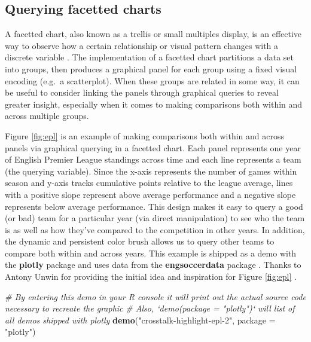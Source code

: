 \documentclass[
  12pt,
]{krantz}
\newenvironment{Shaded}{\begin{snugshade}}{\end{snugshade}}
\newcommand{\CommentTok}[1]{\textcolor[rgb]{0.56,0.35,0.01}{\textit{#1}}}
\newcommand{\DataTypeTok}[1]{\textcolor[rgb]{0.13,0.29,0.53}{#1}}
\newcommand{\KeywordTok}[1]{\textcolor[rgb]{0.13,0.29,0.53}{\textbf{#1}}}
\newcommand{\NormalTok}[1]{#1}
\newcommand{\StringTok}[1]{\textcolor[rgb]{0.31,0.60,0.02}{#1}}
\begin{document}
\hypertarget{trellis-linking}{%
\subsection{Querying facetted charts}\label{trellis-linking}}

A facetted chart, also known as a trellis or small multiples display, is an effective way to observe how a certain relationship or visual pattern changes with a discrete variable \citep{trellis} \citep{tufte2001}. The implementation of a facetted chart partitions a data set into groups, then produces a graphical panel for each group using a fixed visual encoding (e.g.~a scatterplot). When these groups are related in some way, it can be useful to consider linking the panels through graphical queries to reveal greater insight, especially when it comes to making comparisons both within and across multiple groups.

Figure \ref{fig:epl} is an example of making comparisons both within and across panels via graphical querying in a facetted chart. Each panel represents one year of English Premier League standings across time and each line represents a team (the querying variable). Since the x-axis represents the number of games within season and y-axis tracks cumulative points relative to the league average, lines with a positive slope represent above average performance and a negative slope represents below average performance. This design makes it easy to query a good (or bad) team for a particular year (via direct manipulation) to see who the team is as well as how they've compared to the competition in other years. In addition, the dynamic and persistent color brush allows us to query other teams to compare both within and across years. This example is shipped as a demo with the \textbf{plotly} package and uses data from the \textbf{engsoccerdata} package \citep{engsoccerdata}. Thanks to Antony Unwin for providing the initial idea and inspiration for Figure \ref{fig:epl} \citep{unwin-epl}.

\begin{Shaded}
\begin{Highlighting}[]
\CommentTok{# By entering this demo in your R console it will print out the actual source code necessary to recreate the graphic}
\CommentTok{# Also, `demo(package = "plotly")` will list of all demos shipped with plotly}
\KeywordTok{demo}\NormalTok{(}\StringTok{"crosstalk-highlight-epl-2"}\NormalTok{, }\DataTypeTok{package =} \StringTok{"plotly"}\NormalTok{)}
\end{Highlighting}
\end{Shaded}
\end{document}
